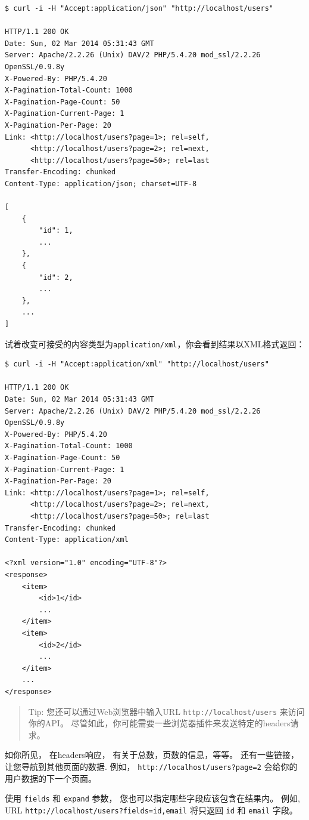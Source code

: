 \begin{lstlisting}
$ curl -i -H "Accept:application/json" "http://localhost/users"

HTTP/1.1 200 OK
Date: Sun, 02 Mar 2014 05:31:43 GMT
Server: Apache/2.2.26 (Unix) DAV/2 PHP/5.4.20 mod_ssl/2.2.26 OpenSSL/0.9.8y
X-Powered-By: PHP/5.4.20
X-Pagination-Total-Count: 1000
X-Pagination-Page-Count: 50
X-Pagination-Current-Page: 1
X-Pagination-Per-Page: 20
Link: <http://localhost/users?page=1>; rel=self, 
      <http://localhost/users?page=2>; rel=next, 
      <http://localhost/users?page=50>; rel=last
Transfer-Encoding: chunked
Content-Type: application/json; charset=UTF-8

[
    {
        "id": 1,
        ...
    },
    {
        "id": 2,
        ...
    },
    ...
]
\end{lstlisting}
试着改变可接受的内容类型为\lstinline|application/xml|，你会看到结果以XML格式返回：

\begin{lstlisting}
$ curl -i -H "Accept:application/xml" "http://localhost/users"

HTTP/1.1 200 OK
Date: Sun, 02 Mar 2014 05:31:43 GMT
Server: Apache/2.2.26 (Unix) DAV/2 PHP/5.4.20 mod_ssl/2.2.26 OpenSSL/0.9.8y
X-Powered-By: PHP/5.4.20
X-Pagination-Total-Count: 1000
X-Pagination-Page-Count: 50
X-Pagination-Current-Page: 1
X-Pagination-Per-Page: 20
Link: <http://localhost/users?page=1>; rel=self, 
      <http://localhost/users?page=2>; rel=next, 
      <http://localhost/users?page=50>; rel=last
Transfer-Encoding: chunked
Content-Type: application/xml

<?xml version="1.0" encoding="UTF-8"?>
<response>
    <item>
        <id>1</id>
        ...
    </item>
    <item>
        <id>2</id>
        ...
    </item>
    ...
</response>
\end{lstlisting}
\begin{quote}Tip: 您还可以通过Web浏览器中输入URL \lstinline|http://localhost/users| 来访问你的API。
  尽管如此，你可能需要一些浏览器插件来发送特定的headers请求。

\end{quote}
如你所见， 在headers响应， 有关于总数，页数的信息，等等。
还有一些链接，让您导航到其他页面的数据. 例如， \lstinline|http://localhost/users?page=2|
会给你的用户数据的下一个页面。

使用 \lstinline|fields| 和 \lstinline|expand| 参数， 您也可以指定哪些字段应该包含在结果内。
例如, URL \lstinline|http://localhost/users?fields=id,email| 将只返回 \lstinline|id| 和 \lstinline|email| 字段。


